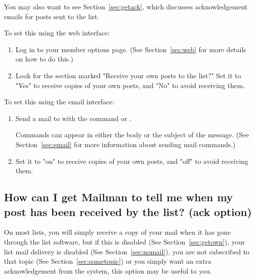\documentclass{howto}
\begin{document}

You may also want to see Section~\ref{sec:getack}, which discusses 
acknowledgement emails for posts sent to the list.

To set this using the web interface:
\begin{enumerate}
	\item Log in to your member options page.  (See Section~\ref{sec:web} 
	for more details on how to do this.)
	\item Look for the section marked "Receive your own posts to the list?"  
	Set it to "Yes" to receive copies of your own posts, and  "No" to avoid
	receiving them.
\end{enumerate}

To set this using the email interface:
\begin{enumerate}
   \item Send a mail to  with the command
    or .

   Commands can appear
   in either the body or the subject of the message.  (See
   Section~\ref{sec:email} for more information about sending mail
   commands.)
	\item Set it to "on" to receive copies of your own posts, and "off"
	to avoid receiving them.
\end{enumerate}


\subsection{How can I get Mailman to tell me when my post has been received
by the list? (ack option)\label{sec:getack}}

On most lists, you will simply receive a copy of your mail when it has gone
through the list software, but if this is disabled (See 
Section~\ref{sec:getown}), your list mail delivery is disabled (See
Section~\ref{sec:nomail}), you are not subscribed to that topic (See
Section~\ref{sec:sometopic}) or you
simply want an extra acknowledgement from the system, this option may
be useful to you.

\end{document}

